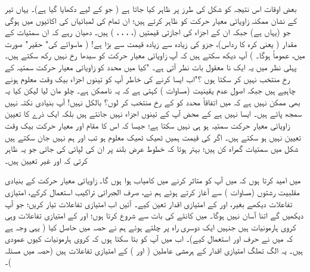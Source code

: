  بعض اوقات اس نتیجہ کو شکل  کی طرز پر ظاہر کیا جاتا ہے ( جو  کے لیے دکھایا گیا ہے)۔ یہاں تیر کے نشان ممکنہ زاویائی  معیار حرکت کو ظاہر کرتے ہیں؛  ان تمام کی لمبائیاں   کی اکائیوں میں  ہوگی جو (یہاں  ہے)  جبکہ  ان  کے  اجزاء  کی اجازتی قیمتیں (، ، ، ، )  ہیں۔  دھیان رہے کہ ان سمتیات  کے مقدار (  یعنی کرہ کا رداس)،    جزو کی زیادہ سے زیادہ قیمت سے بڑا ہے! (  ماسوائے  کی" حقیر"  صورت میں،   عموماً  ہوگا۔  )  آپ دیکھ سکتے ہیں کہ آپ زاویائی معیار حرکت کو سیدھا   رخ نہیں رکھ سکتے ہیں۔ پہلی نظر میں یہ ایک نا معقول بات نظر آتی ہے۔ "کیا میں  محدد کو زاویائی معیار حرکت سمتیہ کے رخ منتخب نہیں کر سکتا ہوں ؟"اب ایسا کرنے کی خاطر آپ کو تینوں اجزاء بیک وقت معلوم ہونے چاہیے ہیں جبکہ اصول عدم یقینیت  (مساوات  )   کہتی ہے کہ یہ ناممکن ہے۔  چلو  مان لیا لیکن کیا یہ بھی ممکن نہیں ہے کہ میں اتفاقاً   محدد کو  کے رخ منتخب  کر    لوں؟     بالکل نہیں!  آپ بنیادی نکتہ نہیں سمجھ پائے  ہیں۔  ایسا نہیں ہے کے  محض آپ   کے تینوں اجزاء نہیں جانتے ہیں بلکہ ایک ذرے   کا   تعیین زاویائی معیار حرکت سمتیہ  ہو ہی  نہیں  سکتا ہے؛  جیسا کہ اس کا مقام اور معیار حرکت بیک وقت تعیین  نہیں ہو سکتے ہیں۔ اگر  کی قیمت  ہمیں ٹھیک ٹھیک معلوم ہو تب  اور  ہم  نہیں جان سکتے ہیں  شکل    میں سمتیات گمراہ کن ہیں؛  بہتر ہوتا کہ خطوط عرض بلند پر  ان کی لپائی کی جاتی جو یہ ظاہر کرتی کہ  اور  غیر تعیین  ہیں۔

 میں امید کرتا ہوں کہ میں آپ کو متاثر کرنے میں کامیاب ہوا ہوں گا۔  زاویائی معیار حرکت کے بنیادی مقلبیت رشتوں   (مساوات ) سے آغاز کرتے ہوئے ہم نے،  صرف الجبرائی تراکیب استعمال کرکے،  امتیازی تفاعلات دیکھے بغیر،   اور  کے امتیازی اقدار تعین کیے۔ آئیں  اب امتیازی تفاعلات تیار کریں؛  جو  آپ دیکھیں گے اتنا آسان نہیں ہوگا۔ میں  کانٹے  کی بات     سے شروع کرتا ہوں؛   اور  کے  امتیازی تفاعلات وہی کروی ہارمونیات ہیں جنہیں ایک دوسری راہ پر چلتے ہوئے ہم نے حصہ  میں حاصل کیا (  یہی وجہ ہے کہ میں نے حرف  اور  استعمال کیے)۔  اب میں آپ کو بتا  سکتا ہوں  کہ کروی ہارمونیات کیوں عمودی ہیں۔ یہ الگ تھلگ امتیازی اقدار کے ہرمشی عاملین (  اور )  کے امتیازی تفاعلات ہیں (حصہ  میں مسئلہ )۔ 

